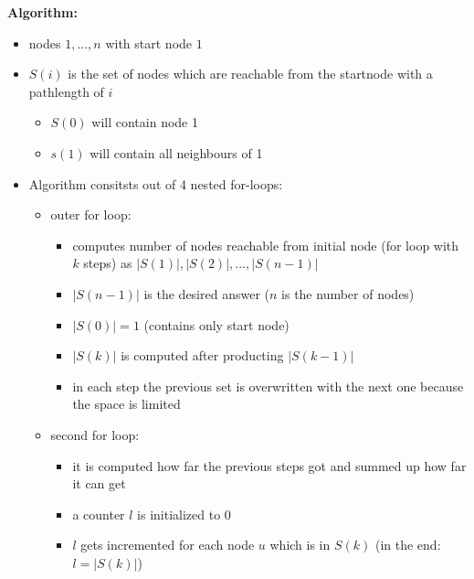 \documentclass[a4]{scrartcl}
\begin{document}
\textbf{Algorithm:}
\begin{itemize}
\item nodes $1,...,n$ with start node $1$
\item $S(i)$ is the set of nodes which are reachable from the startnode with a pathlength of $i$
\begin{itemize}
\item $S(0)$ will contain node 1
\item $s(1)$ will contain all neighbours of 1
\end{itemize}

\item Algorithm consitsts out of 4 nested for-loops:

\begin{itemize}
\item outer for loop:
\begin{itemize}
\item computes number of nodes reachable from initial node (for loop with $k$ steps) as $|S(1)|, |S(2)|, ..., |S(n-1)|$
\item $|S(n-1)|$ is the desired answer ($n$ is the number of nodes)
\item $|S(0)| = 1$ (contains only start node)
\item $|S(k)|$ is computed after producting $|S(k-1)|$
\item in each step the previous set is overwritten with the next one because the space is limited
\end{itemize}

\item second for loop:
\begin{itemize}
\item it is computed how far the previous steps got and summed up how far it can get
\item a counter $l$ is initialized to 0
\item $l$ gets incremented for each node $u$ which is in $S(k)$ (in the end: $l = |S(k)|$)
\end{itemize}


\end{itemize}
\end{itemize}
\end{document}
